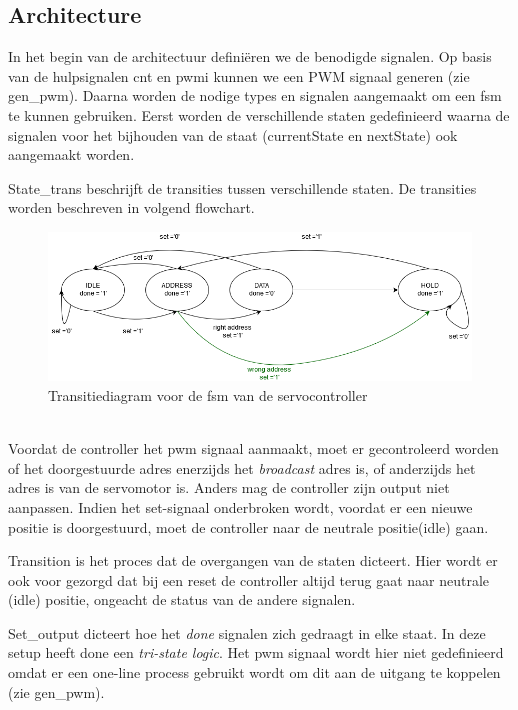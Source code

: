 \subsection{Architecture}
In het begin van de architectuur defini\"{e}ren we de benodigde signalen. Op basis van de hulpsignalen cnt en pwmi kunnen we een PWM signaal generen (zie gen\_pwm). Daarna worden de nodige types en signalen aangemaakt om een \gls{fsm} te kunnen gebruiken. Eerst worden de verschillende staten gedefinieerd waarna de signalen voor het bijhouden van de staat (currentState en nextState) ook aangemaakt worden.


State\_trans beschrijft de transities tussen verschillende staten. De transities worden beschreven in volgend flowchart.
\begin{figure}[h]
	\centering
	\includegraphics[width=\linewidth]{servocontrol.png}
	\caption{Transitiediagram voor de \gls{fsm} van de servocontroller}
\end{figure}\\
 Voordat de controller het \gls{pwm} signaal aanmaakt, moet er gecontroleerd worden of het doorgestuurde adres enerzijds het \textit{broadcast} adres is, of anderzijds het adres is van de servomotor is. Anders mag de controller zijn output niet aanpassen. Indien het set-signaal onderbroken wordt, voordat er een nieuwe positie is doorgestuurd, moet de controller naar de neutrale positie(idle) gaan.


Transition is het proces dat de overgangen van de staten dicteert. Hier wordt er ook voor gezorgd dat bij een reset de controller altijd terug gaat naar neutrale (idle) positie, ongeacht de status van de andere signalen.


Set\_output dicteert hoe het \textit{done} signalen zich gedraagt in elke staat. In deze setup heeft done een \textit{tri-state logic}. Het \gls{pwm} signaal wordt hier niet gedefinieerd omdat er een one-line process gebruikt wordt om dit aan de uitgang te koppelen (zie gen\_pwm).

